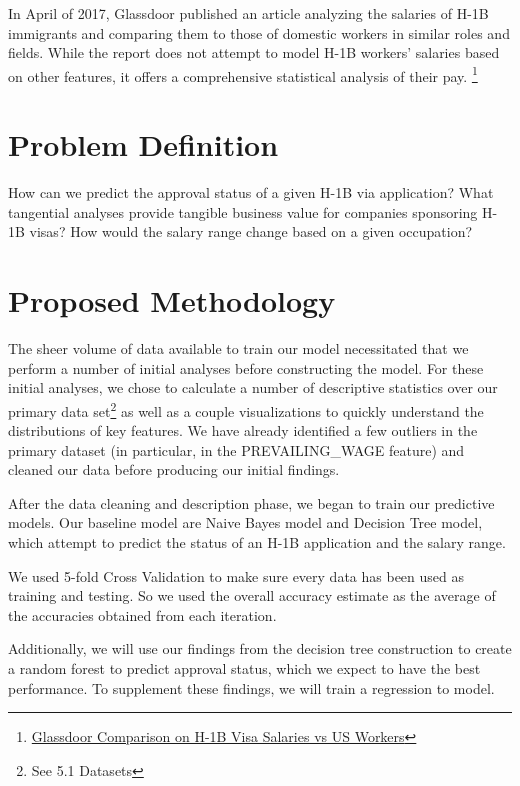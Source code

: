 \documentclass[sigconf]{acmart}
\begin{document}
In April of 2017, Glassdoor published an article analyzing the salaries of H-1B immigrants and
comparing them to those of domestic workers in similar roles and fields. While the report does
not attempt to model H-1B workers’ salaries based on other features, it offers a comprehensive
statistical analysis of their pay.
\footnote{\href{https://www.glassdoor.com/research/h1b-workers/}{Glassdoor Comparison on H-1B Visa Salaries vs US Workers}}


\section{Problem Definition}

How can we predict the approval status of a given H-1B via application? What tangential
analyses provide tangible business value for companies sponsoring H-1B visas? How would the salary
range change based on a given occupation?


\section{Proposed Methodology}

The sheer volume of data available to train our model necessitated that we perform a number of
initial analyses before constructing the model. For these initial analyses, we chose to
calculate a number of descriptive statistics over our primary data set\footnote{See 5.1 Datasets} as
well as a couple visualizations to quickly understand the distributions of key features. We have
already identified a few outliers in the primary dataset (in particular, in the PREVAILING\_WAGE
feature) and cleaned our data before producing our initial findings.

After the data cleaning and description phase, we began to train our predictive models. Our baseline
model are Naive Bayes model and Decision Tree model, which attempt to predict the status of an H-1B
application and the salary range.

We used 5-fold Cross Validation to make sure every data has been used as training and testing. So we
used the overall accuracy estimate as the average of the accuracies obtained from each iteration.

Additionally, we will use our findings from the decision tree construction to create a random forest
to predict approval status, which we expect to have the best performance. To supplement these
findings, we will train a regression to model.
\end{document}
